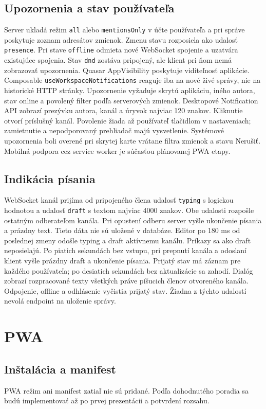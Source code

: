 \documentclass[11pt,a4paper]{article}
\begin{document}
\subsection{Upozornenia a stav používateľa}
Server ukladá režim \texttt{all} alebo \texttt{mentionsOnly} v účte
používateľa a pri správe poskytuje zoznam adresátov zmienok. Zmenu stavu
rozposiela ako udalosť \texttt{presence}. Pri stave \texttt{offline} odmieta
nové WebSocket spojenie a uzatvára existujúce spojenia. Stav \texttt{dnd}
zostáva pripojený, ale klient pri ňom nemá zobrazovať upozornenia.
Quasar AppVisibility poskytuje viditeľnosť aplikácie. Composable
\texttt{useWorkspaceNotifications} reaguje iba na nové živé správy,
nie na historické HTTP stránky. Upozornenie vyžaduje skrytú aplikáciu,
iného autora, stav online a povolený filter podľa serverových zmienok.
Desktopové Notification API zobrazí prezývku autora, kanál a úryvok
najviac 120 znakov. Kliknutie otvorí príslušný kanál. Povolenie žiada
až používateľ tlačidlom v nastaveniach; zamietnutie a nepodporovaný
prehliadač majú vysvetlenie. Systémové upozornenia boli overené pri skrytej
karte vrátane filtra zmienok a stavu Nerušiť. Mobilná podpora cez service
worker je súčasťou plánovanej PWA etapy.

\subsection{Indikácia písania}
WebSocket kanál prijíma od pripojeného člena udalosť \texttt{typing}
s logickou hodnotou a udalosť \texttt{draft} s textom najviac 4000 znakov.
Obe udalosti rozpošle ostatným odberateľom kanála. Pri opustení odberu
server vyšle ukončenie písania a prázdny text. Tieto dáta nie sú uložené
v databáze.
Editor po 180 ms od poslednej zmeny odošle typing a draft aktívnemu
kanálu. Príkazy sa ako draft neposielajú. Po piatich sekundách bez
vstupu, pri prepnutí kanála a odoslaní klient vyšle prázdny draft
a ukončenie písania. Prijatý stav má záznam pre každého používateľa;
po desiatich sekundách bez aktualizácie sa zahodí. Dialóg zobrazí
rozpracované texty všetkých práve píšucich členov otvoreného kanála.
Odpojenie, offline a odhlásenie vyčistia prijatý stav. Žiadna z týchto
udalostí nevolá endpoint na uloženie správy.

\section{PWA}
\subsection{Inštalácia a manifest}
PWA režim ani manifest zatiaľ nie sú pridané. Podľa dohodnutého poradia
sa budú implementovať až po prvej prezentácii a potvrdení rozsahu.
\end{document}
